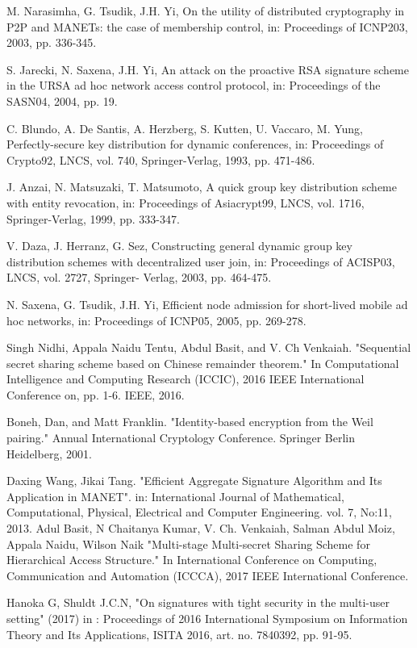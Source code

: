 \documentclass[11pt,a4paper]{llncs}
\begin{document}
\begin{thebibliography}{4}
M. Narasimha, G. Tsudik, J.H. Yi, On the utility of
distributed cryptography in P2P and MANETs: the case of
membership control, in: Proceedings of ICNP203, 2003, pp.
336-345.

S. Jarecki, N. Saxena, J.H. Yi, An attack on the proactive RSA
signature scheme in the URSA ad hoc network access
control protocol, in: Proceedings of the SASN04, 2004, pp.
19.

C. Blundo, A. De Santis, A. Herzberg, S. Kutten, U.
Vaccaro, M. Yung, Perfectly-secure key distribution for
dynamic conferences, in: Proceedings of Crypto92, LNCS,
vol. 740, Springer-Verlag, 1993, pp. 471-486.


J. Anzai, N. Matsuzaki, T. Matsumoto, A quick group key
distribution scheme with entity revocation, in: Proceedings
of Asiacrypt99, LNCS, vol. 1716, Springer-Verlag, 1999, pp.
333-347.

V. Daza, J. Herranz, G. Sez, Constructing general dynamic
group key distribution schemes with decentralized user join,
in: Proceedings of ACISP03, LNCS, vol. 2727, Springer-
Verlag, 2003, pp. 464-475.

N. Saxena, G. Tsudik, J.H. Yi, Efficient node admission for
short-lived mobile ad hoc networks, in: Proceedings of
ICNP05, 2005, pp. 269-278.

Singh Nidhi, Appala Naidu Tentu, Abdul Basit, and V. Ch Venkaiah. "Sequential secret sharing scheme based on Chinese remainder theorem." In Computational Intelligence and Computing Research (ICCIC), 2016 IEEE International Conference on, pp. 1-6. IEEE, 2016.

Boneh, Dan, and Matt Franklin. "Identity-based encryption from the Weil pairing." Annual International Cryptology Conference. Springer Berlin Heidelberg, 2001.

Daxing Wang, Jikai Tang. "Efficient Aggregate Signature Algorithm and Its Application in MANET". in: International Journal of Mathematical, Computational, Physical, Electrical and Computer Engineering. vol. 7, No:11, 2013.
Adul Basit, N Chaitanya Kumar, V. Ch. Venkaiah, Salman Abdul Moiz, Appala Naidu, Wilson Naik
"Multi-stage Multi-secret Sharing Scheme for Hierarchical Access Structure." In International Conference on Computing, Communication and Automation (ICCCA), 2017 IEEE International Conference.


Hanoka G, Shuldt J.C.N, "On signatures with tight security in the multi-user setting"
(2017) in : Proceedings of 2016 International Symposium on Information Theory and Its Applications, ISITA 2016, art. no. 7840392, pp. 91-95.

\end{thebibliography}
\end{document}
